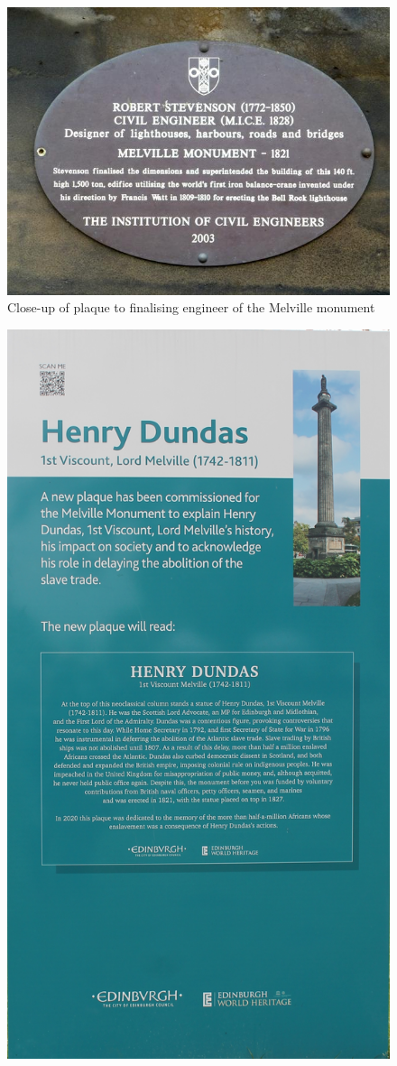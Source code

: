 \documentclass{scrartcl}
\begin{document}
\begin{appendices}
\begin{figure}
    \centering
    \includegraphics[width=1\linewidth]{img/stevenson_plaque.jpg}
    \caption{Close-up of plaque to finalising engineer of the Melville monument}
    \label{fig:stevenson_plaque}
\end{figure}
\begin{figure}
    \centering
    \includegraphics[width=0.75\linewidth]{img/melville_temp.jpg}

\end{figure}
\end{appendices}
\end{document}
